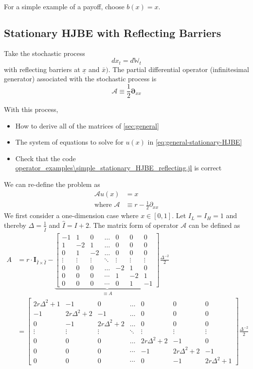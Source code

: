 \documentclass[11pt]{article}
\newcommand{\D}[1][]{\ensuremath{\boldsymbol{\partial}_{#1}}}
\newcommand{\W}{\ensuremath{\mathbb{W}}}
\newcommand{\A}{\ensuremath{\mathcal{A}}}
\begin{document}
For a simple example of a payoff, choose $b(x) = x$.

\subsection{Stationary HJBE with Reflecting Barriers}
Take the stochastic process
$$
d x_t = d \W_t
$$
with reflecting barriers at $\underline{x}$ and $\bar{x})$.  The partial differential operator (infinitesimal generator) associated with the stochastic process is
$$
	\A \equiv \frac{1}{2}\D[xx]
$$

With this process,
\begin{itemize}
	\item How to derive all of the matrices of \cref{sec:general}
	\item The system of equations to solve for $u(x)$ in \cref{eq:general-stationary-HJBE}
	\item Check that the code \url{operator_examples\simple_stationary_HJBE_reflecting.jl} is correct
\end{itemize}
We can re-define the problem as 
\begin{align}
\A u(x) &= x\label{HJBE_reflecting_barriers_PDE}\\
\text{where }\A&\equiv r - \frac{1}{2}\partial_{xx}
\end{align}
We first consider a one-dimension case where $x\in [0, 1]$. Let $I_L = I_H = 1$ and thereby $\Delta  = \frac{1}{\hat{I}}$ and $\hat{I} = I+2$. The matrix form of operator $\A$ can be defined as
\begin{align}
A &= r\cdot \mathbf{I}_{\hat{I}\times\hat{I}}-\underbrace{\begin{bmatrix}
-1&1&0&\dots&0&0&0\\
1&-2&1&\dots&0&0&0\\
0&1&-2&\dots&0&0&0\\
\vdots&\vdots&\vdots&\ddots&\vdots&\vdots&\vdots\\
0&0&0&\dots&-2&1&0\\
0&0&0&\cdots&1&-2&1\\
0&0&0&\cdots&0&1&-1
\end{bmatrix}}_{\equiv A}\frac{\Delta^{-2}}{2}\nonumber\\
&=
\begin{bmatrix}
2r\Delta^2+1&-1&0&\dots&0&0&0\\
-1&2r\Delta^2+2&-1&\dots&0&0&0\\
0&-1&2r\Delta^2+2&\dots&0&0&0\\
\vdots&\vdots&\vdots&\ddots&\vdots&\vdots&\vdots\\
0&0&0&\dots&2r\Delta^2+2&-1&0\\
0&0&0&\cdots&-1&2r\Delta^2+2&-1\\
0&0&0&\cdots&0&-1&2r\Delta^2+1
\end{bmatrix}\frac{\Delta^{-2}}{2}
\end{align}
\end{document}
